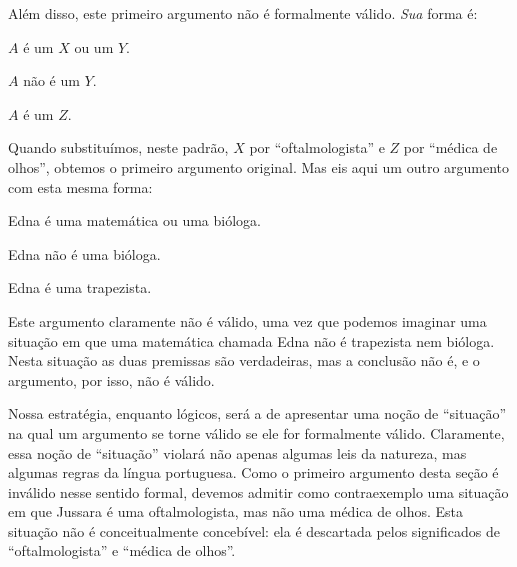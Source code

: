 Além disso, este primeiro argumento não é formalmente válido. \emph{Sua} forma é:
\begin{earg}
	\item[] $A$ é um $X$ ou um $Y$.
	\item[] $A$ não é um $Y$.
	\item[\therefore] $A$ é um $Z$.
\end{earg}
Quando substituímos, neste padrão, $X$ por ``oftalmologista'' e $Z$ por ``médica de olhos'', obtemos o primeiro argumento original.
Mas eis aqui um outro argumento com esta mesma forma:
\begin{earg}
	\item[] Edna é uma matemática ou uma bióloga.
	\item[] Edna não é uma bióloga.
	\item[\therefore] Edna é uma trapezista.
\end{earg}
Este argumento claramente não é válido, uma vez que podemos imaginar uma situação em que uma matemática chamada Edna  não é  trapezista nem  bióloga.
Nesta situação as duas premissas são verdadeiras, mas a conclusão não é, e o argumento, por isso, não é válido.

Nossa estratégia, enquanto lógicos, será a de apresentar uma noção de ``situação'' na qual um argumento se torne válido se ele for formalmente válido.
Claramente, essa noção de ``situação'' violará não apenas algumas leis da natureza, mas algumas regras da língua portuguesa.
Como o primeiro argumento desta seção é inválido nesse sentido formal, devemos admitir como contraexemplo uma situação em que Jussara é uma oftalmologista, mas não uma médica de olhos.
Esta situação não é conceitualmente concebível: ela é descartada pelos significados de ``oftalmologista'' e ``médica de olhos''.


